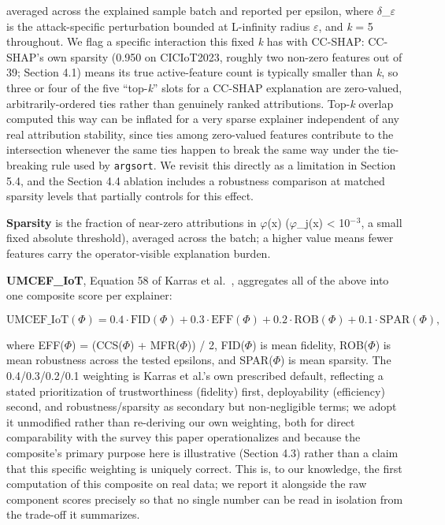 averaged across the explained sample batch and reported per epsilon, where $\delta$\_$\varepsilon$ is the attack-specific perturbation bounded at L-infinity radius $\varepsilon$, and \emph{k} = 5 throughout. We flag a specific interaction this fixed \emph{k} has with CC-SHAP: CC-SHAP's own sparsity (0.950 on CICIoT2023, roughly two non-zero features out of 39; Section 4.1) means its true active-feature count is typically smaller than \emph{k}, so three or four of the five ``top-\emph{k}'' slots for a CC-SHAP explanation are zero-valued, arbitrarily-ordered ties rather than genuinely ranked attributions. Top-\emph{k} overlap computed this way can be inflated for a very sparse explainer independent of any real attribution stability, since ties among zero-valued features contribute to the intersection whenever the same ties happen to break the same way under the tie-breaking rule used by \texttt{argsort}. We revisit this directly as a limitation in Section 5.4, and the Section 4.4 ablation includes a robustness comparison at matched sparsity levels that partially controls for this effect.

\textbf{Sparsity} is the fraction of near-zero attributions in $\varphi$(x) (\textbar{}$\varphi$\_j(x)\textbar{} \textless{} 10$^{-}$$^{3}$, a small fixed absolute threshold), averaged across the batch; a higher value means fewer features carry the operator-visible explanation burden.

\textbf{UMCEF\_IoT}, Equation 58 of Karras et al.~\citep{ref1}, aggregates all of the above into one composite score per explainer:

\begin{equation}\mathrm{UMCEF\_IoT}(\Phi) = 0.4 \cdot \mathrm{FID}(\Phi) + 0.3 \cdot \mathrm{EFF}(\Phi) + 0.2 \cdot \mathrm{ROB}(\Phi) + 0.1 \cdot \mathrm{SPAR}(\Phi),\end{equation}

where EFF($\Phi$) = (CCS($\Phi$) + MFR($\Phi$)) / 2, FID($\Phi$) is mean fidelity, ROB($\Phi$) is mean robustness across the tested epsilons, and SPAR($\Phi$) is mean sparsity. The 0.4/0.3/0.2/0.1 weighting is Karras et al.'s own prescribed default, reflecting a stated prioritization of trustworthiness (fidelity) first, deployability (efficiency) second, and robustness/sparsity as secondary but non-negligible terms; we adopt it unmodified rather than re-deriving our own weighting, both for direct comparability with the survey this paper operationalizes and because the composite's primary purpose here is illustrative (Section 4.3) rather than a claim that this specific weighting is uniquely correct. This is, to our knowledge, the first computation of this composite on real data; we report it alongside the raw component scores precisely so that no single number can be read in isolation from the trade-off it summarizes.

